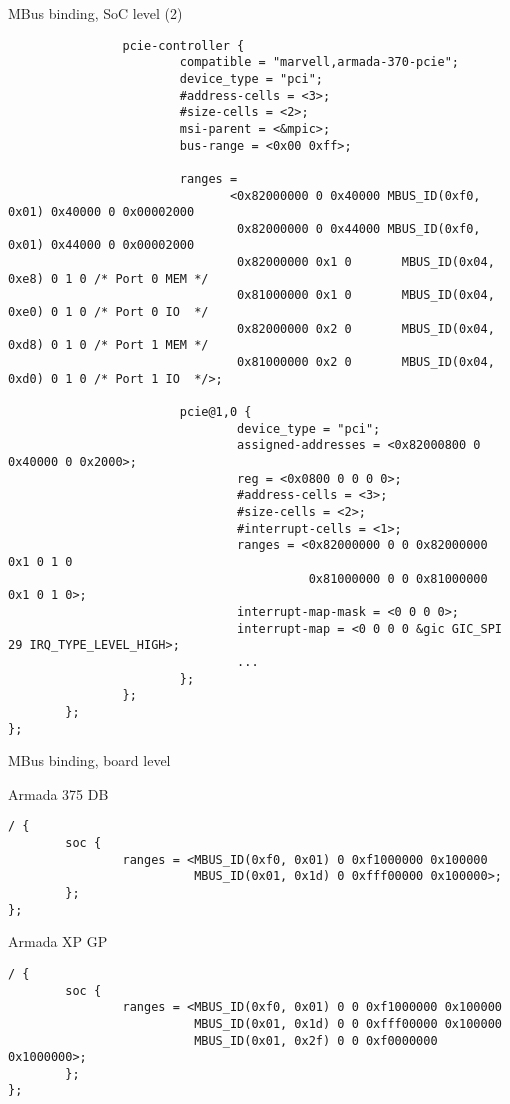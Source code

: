 \begin{frame}[fragile]{MBus binding, SoC level (2)}

\tiny
\begin{verbatim}
                pcie-controller {
                        compatible = "marvell,armada-370-pcie";
                        device_type = "pci";
                        #address-cells = <3>;
                        #size-cells = <2>;
                        msi-parent = <&mpic>;
                        bus-range = <0x00 0xff>;

                        ranges =
                               <0x82000000 0 0x40000 MBUS_ID(0xf0, 0x01) 0x40000 0 0x00002000
                                0x82000000 0 0x44000 MBUS_ID(0xf0, 0x01) 0x44000 0 0x00002000
                                0x82000000 0x1 0       MBUS_ID(0x04, 0xe8) 0 1 0 /* Port 0 MEM */
                                0x81000000 0x1 0       MBUS_ID(0x04, 0xe0) 0 1 0 /* Port 0 IO  */
                                0x82000000 0x2 0       MBUS_ID(0x04, 0xd8) 0 1 0 /* Port 1 MEM */
                                0x81000000 0x2 0       MBUS_ID(0x04, 0xd0) 0 1 0 /* Port 1 IO  */>;

                        pcie@1,0 {
                                device_type = "pci";
                                assigned-addresses = <0x82000800 0 0x40000 0 0x2000>;
                                reg = <0x0800 0 0 0 0>;
                                #address-cells = <3>;
                                #size-cells = <2>;
                                #interrupt-cells = <1>;
                                ranges = <0x82000000 0 0 0x82000000 0x1 0 1 0
                                          0x81000000 0 0 0x81000000 0x1 0 1 0>;
                                interrupt-map-mask = <0 0 0 0>;
                                interrupt-map = <0 0 0 0 &gic GIC_SPI 29 IRQ_TYPE_LEVEL_HIGH>;
                                ...
                        };
                };
        };
};
\end{verbatim}
\end{frame}

\begin{frame}[fragile]{MBus binding, board level}

Armada 375 DB

{\tiny
\begin{verbatim}
/ {
        soc {
                ranges = <MBUS_ID(0xf0, 0x01) 0 0xf1000000 0x100000
                          MBUS_ID(0x01, 0x1d) 0 0xfff00000 0x100000>;
        };
};
\end{verbatim}
}

Armada XP GP

{\tiny
\begin{verbatim}
/ {
        soc {
                ranges = <MBUS_ID(0xf0, 0x01) 0 0 0xf1000000 0x100000
                          MBUS_ID(0x01, 0x1d) 0 0 0xfff00000 0x100000
                          MBUS_ID(0x01, 0x2f) 0 0 0xf0000000 0x1000000>;
        };
};
\end{verbatim}
}
\end{frame}

